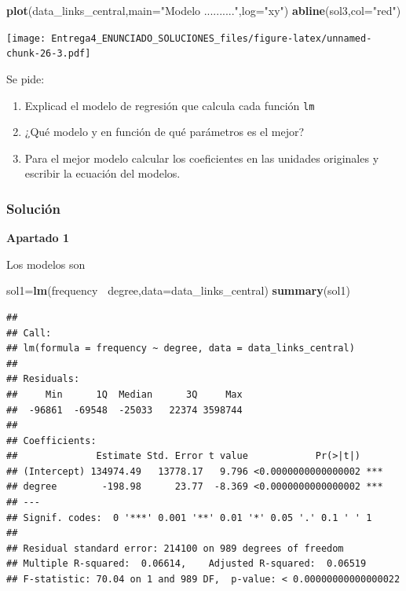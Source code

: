 \documentclass[
]{article}
\newenvironment{Shaded}{\begin{snugshade}}{\end{snugshade}}
\newcommand{\DataTypeTok}[1]{\textcolor[rgb]{0.13,0.29,0.53}{#1}}
\newcommand{\KeywordTok}[1]{\textcolor[rgb]{0.13,0.29,0.53}{\textbf{#1}}}
\newcommand{\NormalTok}[1]{#1}
\newcommand{\OperatorTok}[1]{\textcolor[rgb]{0.81,0.36,0.00}{\textbf{#1}}}
\newcommand{\StringTok}[1]{\textcolor[rgb]{0.31,0.60,0.02}{#1}}
\providecommand{\tightlist}{%
  \setlength{\itemsep}{0pt}\setlength{\parskip}{0pt}}
\begin{document}
\begin{Shaded}
\begin{Highlighting}[]
\KeywordTok{plot}\NormalTok{(data_links_central,}\DataTypeTok{main=}\StringTok{"Modelo .........."}\NormalTok{,}\DataTypeTok{log=}\StringTok{"xy"}\NormalTok{)}
\KeywordTok{abline}\NormalTok{(sol3,}\DataTypeTok{col=}\StringTok{"red"}\NormalTok{)}
\end{Highlighting}
\end{Shaded}

\texttt{[image: Entrega4\_ENUNCIADO\_SOLUCIONES\_files/figure-latex/unnamed-chunk-26-3.pdf]}

Se pide:

\begin{enumerate}
\def\labelenumi{\arabic{enumi}.}
\tightlist
\item
  Explicad el modelo de regresión que calcula cada función \texttt{lm}
\item
  ¿Qué modelo y en función de qué parámetros es el mejor?
\item
  Para el mejor modelo calcular los coeficientes en las unidades
  originales y escribir la ecuación del modelos.
\end{enumerate}

\hypertarget{soluciuxf3n-4}{%
\subsubsection{Solución}\label{soluciuxf3n-4}}

\textbf{Apartado 1}

Los modelos son

\begin{Shaded}
\begin{Highlighting}[]
\NormalTok{sol1=}\KeywordTok{lm}\NormalTok{(frequency}\OperatorTok{~}\StringTok{ }\NormalTok{degree,}\DataTypeTok{data=}\NormalTok{data_links_central)}
\KeywordTok{summary}\NormalTok{(sol1)}
\end{Highlighting}
\end{Shaded}

\begin{verbatim}
## 
## Call:
## lm(formula = frequency ~ degree, data = data_links_central)
## 
## Residuals:
##     Min      1Q  Median      3Q     Max 
##  -96861  -69548  -25033   22374 3598744 
## 
## Coefficients:
##              Estimate Std. Error t value            Pr(>|t|)    
## (Intercept) 134974.49   13778.17   9.796 <0.0000000000000002 ***
## degree        -198.98      23.77  -8.369 <0.0000000000000002 ***
## ---
## Signif. codes:  0 '***' 0.001 '**' 0.01 '*' 0.05 '.' 0.1 ' ' 1
## 
## Residual standard error: 214100 on 989 degrees of freedom
## Multiple R-squared:  0.06614,    Adjusted R-squared:  0.06519 
## F-statistic: 70.04 on 1 and 989 DF,  p-value: < 0.00000000000000022
\end{verbatim}
\end{document}
